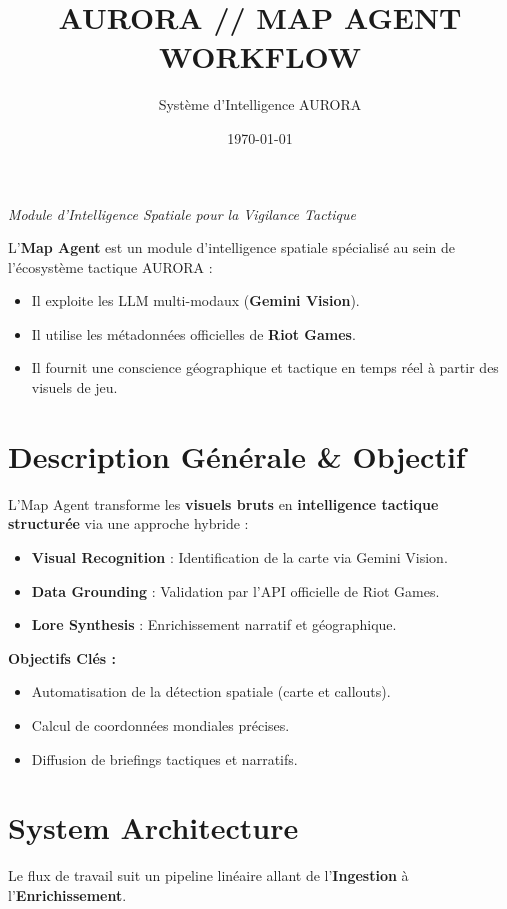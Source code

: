 \documentclass[11pt,a4paper]{article}
\title{\sffamily\bfseries\huge \color{neuralblue} AURORA // MAP AGENT WORKFLOW}
\author{Système d'Intelligence AURORA}
\date{\today}
\begin{document}
\maketitle

\vspace{-1em}
\begin{center}
    \textit{Module d'Intelligence Spatiale pour la Vigilance Tactique}
\end{center}
\vspace{1em}

\noindent L'\textbf{Map Agent} est un module d'intelligence spatiale spécialisé au sein de l'écosystème tactique AURORA :
\begin{itemize}
    \item Il exploite les LLM multi-modaux (\textbf{Gemini Vision}).
    \item Il utilise les métadonnées officielles de \textbf{Riot Games}.
    \item Il fournit une conscience géographique et tactique en temps réel à partir des visuels de jeu.
\end{itemize}

\section{Description Générale \& Objectif}
L'Map Agent transforme les \textbf{visuels bruts} en \textbf{intelligence tactique structurée} via une approche hybride :
\begin{itemize}[label=\textbullet]
    \item \textbf{Visual Recognition} : Identification de la carte via Gemini Vision.
    \item \textbf{Data Grounding} : Validation par l'API officielle de Riot Games.
    \item \textbf{Lore Synthesis} : Enrichissement narratif et géographique.
\end{itemize}

\textbf{Objectifs Clés :}
\begin{itemize}[label=$\diamond$]
    \item Automatisation de la détection spatiale (carte et callouts).
    \item Calcul de coordonnées mondiales précises.
    \item Diffusion de briefings tactiques et narratifs.
\end{itemize}

\section{System Architecture}
Le flux de travail suit un pipeline linéaire allant de l'\textbf{Ingestion} à l'\textbf{Enrichissement}.
\end{document}
